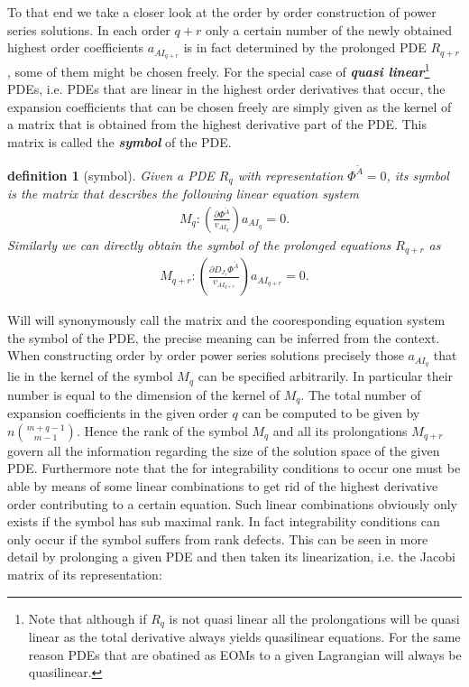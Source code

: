 \documentclass[a4paper,12pt, DIV=14, BCOR=5mm, twoside, headsepline, numbers=noenddot]{scrbook}
\newtheorem{definition}{definition}[section]
\begin{document}
To that end we take a closer look at the order by order construction of power series solutions.
In each order $q+r$ only a certain number of the newly obtained highest order coefficients $a_{AI_{q+r}}$ is in fact determined by the prolonged PDE $R_{q+r}$, some of them might be chosen freely.
For the special case of \textit{\textbf{quasi linear}}\footnote{Note that although if $R_q$ is not quasi linear all the prolongations will be quasi linear as the total derivative always yields quasilinear equations. For the same reason PDEs that are obatined as EOMs to a given Lagrangian will always be quasilinear.} PDEs, i.e. PDEs that are linear in the highest order derivatives that occur, the expansion coefficients that can be chosen freely are simply given as the kernel of a matrix that is obtained from the highest derivative part of the PDE. This matrix is called the \textit{\textbf{symbol}} of the PDE.
\begin{definition}[symbol]
Given a PDE $R_q$ with representation $\Phi^{\tilde{A}}=0$, its symbol is the matrix that describes the following linear equation system 
\begin{align}
    M_q : \left ( \frac{\partial \Phi^{\tilde{A}}}{v_{AI_q}} \right ) a_{AI_q} = 0.
\end{align}
Similarly we can directly obtain the symbol of the prolonged equations $R_{q+r}$ as  
\begin{align}
    M_{q+r} : \left ( \frac{\partial D_{J_r}\Phi^{\tilde{A}
    }}{v_{AI_{q+r}}} \right ) a_{AI_{q+r}} = 0. 
\end{align}
\end{definition}
Will will synonymously call the matrix and the cooresponding equation system the symbol of the PDE, the precise meaning can be inferred from the context. When constructing order by order power series solutions precisely those $a_{AI_q}$ that lie in the kernel of the symbol $M_q$ can be specified arbitrarily. In particular their number is equal to the dimension of the kernel of $M_q$. The total number of expansion coefficients in the given order $q$ can be computed to be given by $n\binom{m+q-1}{m-1}$.
Hence the rank of the symbol $M_q$ and all its prolongations $M_{q+r}$ govern all the information regarding the size of the solution space of the given PDE. Furthermore note that the for integrability conditions to occur one must be able by means of some linear combinations to get rid of the highest derivative order contributing to a certain equation. Such linear combinations obviously only exists if the symbol has sub maximal rank.  In fact integrability conditions can only occur if the symbol suffers from rank defects. This can be seen in more detail by prolonging a given PDE and then taken its linearization, i.e. the Jacobi matrix of its representation:
\end{document}
